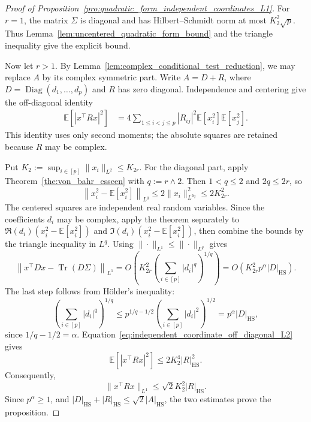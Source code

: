 \documentclass[EJP, preprint, NODS, nobera, nofontexpansion]{ejpecp}
\DeclareMathOperator{\tr}{Tr}
\DeclareMathOperator{\diag}{Diag}
\DeclareMathOperator{\hs}{HS}
\begin{document}
\begin{proof}[Proof of Proposition~\ref{pro:quadratic_form_independent_coordinates_L1}]
For $r=1$, the matrix $\Sigma$ is diagonal and has
Hilbert--Schmidt norm at most $K_2^2\sqrt p$. Thus
Lemma~\ref{lem:uncentered_quadratic_form_bound} and the triangle inequality give the explicit bound.

Now let $r>1$.
By Lemma~\ref{lem:complex_conditional_test_reduction}, we may replace $A$
by its complex symmetric part.  Write $A=D+R$, where
$D=\diag(d_1,\ldots,d_p)$ and $R$ has zero diagonal.  Independence and
centering give the off-diagonal identity
\begin{align}
 \mathbb E\left[|x^\top Rx|^2\right]
 &=4\sum_{1\leq i<j\leq p}|R_{ij}|^2
     \mathbb E[x_i^2]\mathbb E[x_j^2].
 \label{eq:independent_coordinate_off_diagonal_L2}
\end{align}
This identity uses only second moments; the absolute squares are retained
because $R$ may be complex.

Put $K_2:=\sup_{i\in[p]}\|x_i\|_{L^2}\leq K_{2r}$.
For the diagonal part, apply
Theorem~\ref{the:von_bahr_esseen} with \(q:=r\wedge2\).
Then \(1<q\leq2\) and \(2q\leq2r\), so
\[
    \left\|x_i^2-\mathbb E[x_i^2]\right\|_{L^q}
    \leq2\|x_i\|_{L^{2q}}^2
    \leq2K_{2r}^2.
\]
The centered squares are independent real random variables. Since the
coefficients $d_i$ may be complex, apply the theorem separately to
$\Re(d_i)(x_i^2-\mathbb E[x_i^2])$ and
$\Im(d_i)(x_i^2-\mathbb E[x_i^2])$, then combine the bounds by
the triangle inequality in $L^q$. Using
$\|\cdot\|_{L^1}\leq\|\cdot\|_{L^q}$ gives
\[
 \left\|x^\top Dx-\tr(D\Sigma)\right\|_{L^1}
 = O\!\left(K_{2r}^2\left(\sum_{i\in[p]}|d_i|^q\right)^{1/q}\right)
    = O\!\left(K_{2r}^2p^{\alpha}|D|_{\hs}\right).
\]
The last step follows from H\"older's inequality:
\[
    \left(\sum_{i\in[p]}|d_i|^q\right)^{1/q}
    \leq p^{1/q-1/2}\left(\sum_{i\in[p]}|d_i|^2\right)^{1/2}
    =p^\alpha|D|_{\hs},
\]
since $1/q-1/2=\alpha$.
Equation~\eqref{eq:independent_coordinate_off_diagonal_L2} gives
\[
 \mathbb E\left[|x^\top Rx|^2\right]
 \leq2K_2^4|R|_{\hs}^2.
\]
Consequently,
\[
    \|x^\top Rx\|_{L^1}
    \leq\sqrt2K_2^2|R|_{\hs}.
\]
Since $p^\alpha\geq1$, and
$|D|_{\hs}+|R|_{\hs}\leq\sqrt2|A|_{\hs}$, the two estimates prove the
proposition.
\end{proof}
\end{document}
